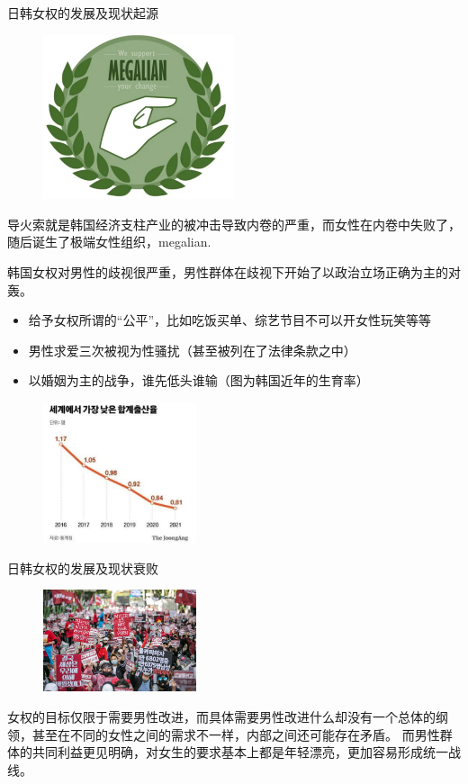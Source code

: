\documentclass{beamer}
\begin{document}
	\begin{frame}{日韩女权的发展及现状}{起源}
		\begin{figure}
			\centering
			\includegraphics[width=0.5\textwidth]{img/图片16.png}
		\end{figure}
		导火索就是韩国经济支柱产业的被冲击导致内卷的严重，而女性在内卷中失败了，随后诞生了极端女性组织，megalian.
	\end{frame}

	\begin{frame}
		韩国女权对男性的歧视很严重，男性群体在歧视下开始了以政治立场正确为主的对轰。
		\begin{itemize}
			\item 给予女权所谓的“公平”，比如吃饭买单、综艺节目不可以开女性玩笑等等
			\item 男性求爱三次被视为性骚扰（甚至被列在了法律条款之中）
			\item 以婚姻为主的战争，谁先低头谁输（图为韩国近年的生育率）
		\end{itemize}
		\begin{figure}
			\centering
			\includegraphics[width=0.4\textwidth]{img/图片17.png}
		\end{figure}
	\end{frame}
	
	\begin{frame}{日韩女权的发展及现状}{衰败}
		\begin{figure}
			\centering
			\includegraphics[width=0.4\textwidth]{img/图片18.png}
		\end{figure}
		女权的目标仅限于需要男性改进，而具体需要男性改进什么却没有一个总体的纲领，甚至在不同的女性之间的需求不一样，内部之间还可能存在矛盾。
		而男性群体的共同利益更见明确，对女生的要求基本上都是年轻漂亮，更加容易形成统一战线。
	\end{frame}
\end{document}
